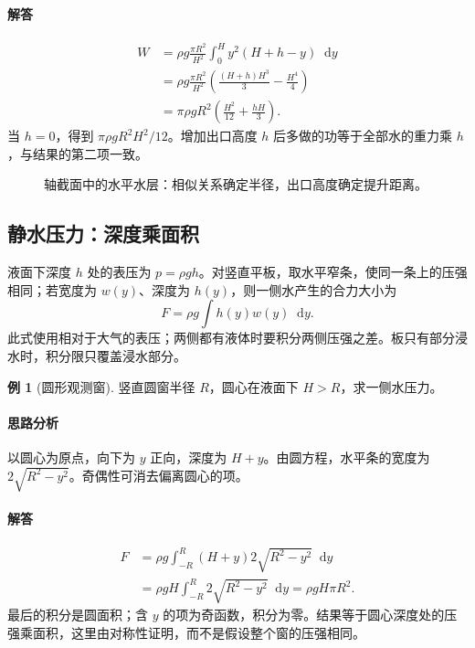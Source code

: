 \documentclass[UTF8,fontset=fandol,12pt,oneside,openany]{ctexrep}
\newcommand{\dd}{\mathop{}\!\mathrm d}
\theoremstyle{definition}
\newtheorem{example}{例}[chapter]
\begin{document}
\paragraph{解答}
\begin{align*}
 W&=\rho g\frac{\pi R^2}{H^2}\int_0^Hy^2(H+h-y)\dd y\\
 &=\rho g\frac{\pi R^2}{H^2}
 \left(\frac{(H+h)H^3}{3}-\frac{H^4}{4}\right)\\
 &=\pi\rho gR^2\left(\frac{H^2}{12}+\frac{hH}{3}\right).
\end{align*}
当 $h=0$，得到 $\pi\rho gR^2H^2/12$。增加出口高度 $h$ 后多做的功等于全部水的重力乘 $h$，与结果的第二项一致。
\begin{figure}[htbp]
\centering
{}
\caption{轴截面中的水平水层：相似关系确定半径，出口高度确定提升距离。}
\end{figure}

\subsection{静水压力：深度乘面积}
液面下深度 $h$ 处的表压为 $p=\rho gh$。对竖直平板，取水平窄条，使同一条上的压强相同；若宽度为 $w(y)$、深度为 $h(y)$，则一侧水产生的合力大小为
\[
 F=\rho g\int h(y)w(y)\dd y.
\]
此式使用相对于大气的表压；两侧都有液体时要积分两侧压强之差。板只有部分浸水时，积分限只覆盖浸水部分。

\begin{example}[圆形观测窗]
竖直圆窗半径 $R$，圆心在液面下 $H>R$，求一侧水压力。
\end{example}
\paragraph{思路分析}以圆心为原点，向下为 $y$ 正向，深度为 $H+y$。由圆方程，水平条的宽度为 $2\sqrt{R^2-y^2}$。奇偶性可消去偏离圆心的项。
\paragraph{解答}
\begin{align*}
 F&=\rho g\int_{-R}^R(H+y)2\sqrt{R^2-y^2}\dd y\\
 &=\rho gH\int_{-R}^R2\sqrt{R^2-y^2}\dd y
 =\rho gH\pi R^2.
\end{align*}
最后的积分是圆面积；含 $y$ 的项为奇函数，积分为零。结果等于圆心深度处的压强乘面积，这里由对称性证明，而不是假设整个窗的压强相同。
\end{document}
